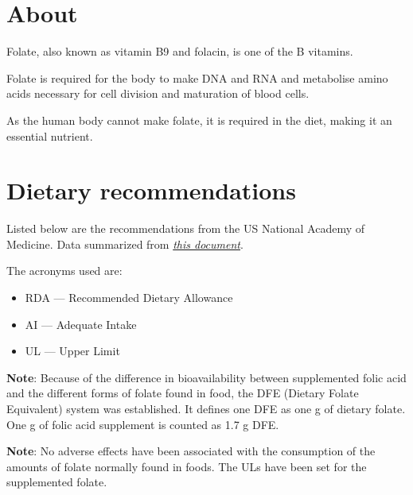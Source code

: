 \documentclass{book}
\begin{document}
\begin{sloppypar}
\section{About}
Folate, also known as vitamin B9 and folacin, is one of the B vitamins.

Folate is required for the body to make DNA and RNA and metabolise amino acids necessary for cell division and maturation of blood cells.

As the human body cannot make folate, it is required in the diet, making it an essential nutrient.

\section{Dietary recommendations}
Listed below are the recommendations from the US National Academy of Medicine. Data summarized from \href{https://nap.nationalacademies.org/read/6015/chapter/10}{\textit{this document}}.

The acronyms used are:
\begin{itemize}
	\item RDA --- Recommended Dietary Allowance
	\item AI --- Adequate Intake
	\item UL --- Upper Limit
\end{itemize}

\textbf{Note}: Because of the difference in bioavailability between supplemented folic acid and the different forms of folate found in food, the DFE (Dietary Folate Equivalent) system was established. It defines one DFE as one \textmu g of dietary folate. One \textmu g of folic acid supplement is counted as 1.7 \textmu g DFE.

\textbf{Note}: No adverse effects have been associated with the consumption of the amounts of folate normally found in foods. The ULs have been set for the supplemented folate.


\end{sloppypar}
\end{document}

